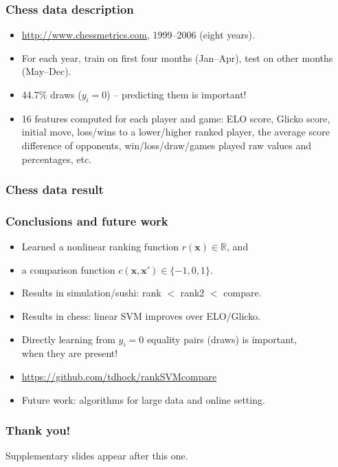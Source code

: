 \documentclass{beamer}
\newcommand{\RR}{\mathbb R}
\begin{document}
\begin{frame}
  \frametitle{Chess data description}
  \begin{itemize}
  \item \url{http://www.chessmetrics.com}, 1999--2006 (eight years).
  \item For each year, train on first four months (Jan--Apr), test on
    other months (May--Dec).
  \item 44.7\% draws ($y_i=0$) -- predicting them is important!
  \item 16 features computed for each player and game: ELO score,
    Glicko score, initial move, loss/wins to a lower/higher ranked
    player, the average score difference of opponents,
    win/loss/draw/games played raw values and percentages, etc.
  \end{itemize}
\end{frame}

\begin{frame}
  \frametitle{Chess data result}
  \begin{minipage}{1.0\linewidth}
    \hskip -1cm
      
  \end{minipage}
\end{frame}

\begin{frame}
  \frametitle{Conclusions and future work}
  \begin{itemize}
  \item Learned a nonlinear ranking function $r(\mathbf x)\in\RR$, and
  \item a comparison function $c(\mathbf x, \mathbf x')\in\{-1,0,1\}$.
  \item Results in simulation/sushi: rank $<$ rank2 $<$ compare.
  \item Results in chess: linear SVM improves over ELO/Glicko.
  \item Directly learning from $y_i=0$ equality pairs (draws) is important,\\
    when they are present!
  \item \url{https://github.com/tdhock/rankSVMcompare}
  \item Future work: algorithms for large data and online setting.
  \end{itemize}
\end{frame}

\begin{frame}
  \frametitle{Thank you!}
  Supplementary slides appear after this one.
\end{frame}
\end{document}
